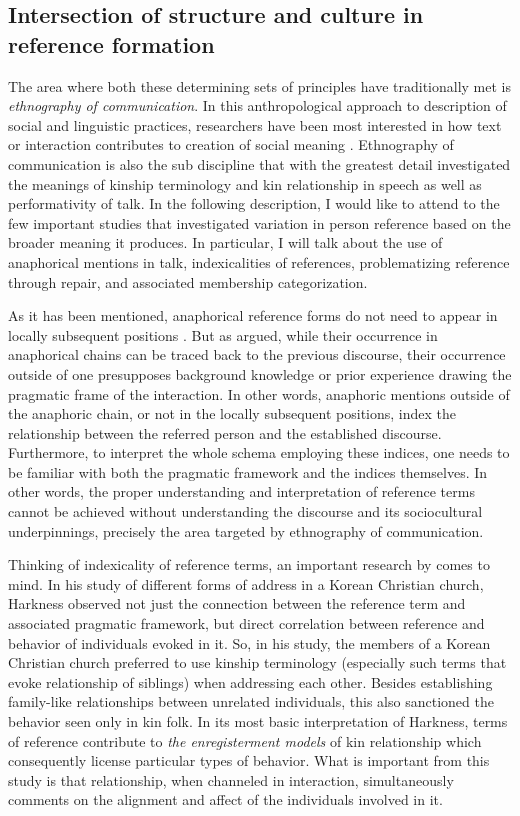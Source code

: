 \documentclass[12pt, draft]{article}
\begin{document}
\subsection{Intersection of structure and culture in reference formation}
The area where both these determining sets of principles have traditionally met is \textit{ethnography of communication}. In this anthropological approach to description of social and linguistic practices, researchers have been most interested in how text or interaction contributes to creation of social meaning \parencite{hymes1989}. Ethnography of communication is also the sub discipline that with the greatest detail investigated the meanings of kinship terminology and kin relationship in speech as well as performativity of talk. In the following description, I would like to attend to the few important studies that investigated variation in person reference based on the broader meaning it produces. In particular, I will talk about the use of anaphorical mentions in talk, indexicalities of references, problematizing reference through repair, and associated membership categorization. 

As it has been mentioned, anaphorical reference forms do not need to appear in locally subsequent positions \parencite{schegloff1996}. But as \textcite{hanks2007} argued, while their occurrence in anaphorical chains can be traced back to the previous discourse, their occurrence outside of one presupposes background knowledge or prior experience drawing the pragmatic frame of the interaction. In other words, anaphoric mentions outside of the anaphoric chain, or not in the locally subsequent positions, index the relationship between the referred person and the established discourse. Furthermore, to interpret the whole schema employing these indices, one needs to be familiar with both the pragmatic framework and the indices themselves. In other words, the proper understanding and interpretation of reference terms cannot be achieved without understanding the discourse and its sociocultural underpinnings, precisely the area targeted by ethnography of communication.

Thinking of indexicality of reference terms, an important research by \textcite{harkness2015} comes to mind. In his study of different forms of address in a Korean Christian church, Harkness observed not just the connection between the reference term and associated pragmatic framework, but direct correlation between reference and behavior of individuals evoked in it. So, in his study, the members of a Korean Christian church preferred to use kinship terminology (especially such terms that evoke relationship of siblings) when addressing each other. Besides establishing family-like relationships between unrelated individuals, this also sanctioned the behavior seen only in kin folk. In its most basic interpretation of Harkness, terms of reference contribute to \textit{the enregisterment models} of kin relationship which consequently license particular types of behavior. What is important from this study is that relationship, when channeled in interaction, simultaneously comments on the alignment and affect of the individuals involved in it. 
\end{document}

